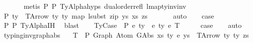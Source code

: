 \begin{isabellebody}
\ \ \ \ \ \isamarkupfalse%
\ {\isacharparenleft}{\kern0pt}metis\ P{}{}\ P{}{}\ TyAlpha{\isachardot}{\kern0pt}hyps{\isacharparenleft}{\kern0pt}{}{\isacharcomma}{\kern0pt}{}{\isacharcomma}{\kern0pt}{}{\isacharparenright}{\kern0pt}\ dual{\isacharunderscore}{\kern0pt}order{\isachardot}{\kern0pt}refl\ lmap{\isacharunderscore}{\kern0pt}ty{\isacharunderscore}{\kern0pt}inv{\isacharunderscore}{\kern0pt}inv{\isacharparenright}{\kern0pt}\isanewline
\ \ \isamarkupfalse%
\ \isamarkupfalse%
\ P{}{}{\isacharcolon}{\kern0pt}\ {\isachardoublequoteopen}ty{\isacharprime}{\kern0pt}\ {\isacharequal}{\kern0pt}\ TArrow\ ty{}\ ty{}\ {\isacharparenleft}{\kern0pt}map\ {\isacharparenleft}{\kern0pt}lsubst\ {\isacharparenleft}{\kern0pt}zip\ ys{\isacharprime}{\kern0pt}\ xs{\isacharprime}{\kern0pt}{\isacharparenright}{\kern0pt}{\isacharparenright}{\kern0pt}\ zs{\isacharparenright}{\kern0pt}{\isachardoublequoteclose}\isanewline
\ \ \ \ \ \isamarkupfalse%
\ auto\isanewline
\isanewline
\ \ \isamarkupfalse%
\ {\isacharquery}{\kern0pt}case\isanewline
\ \ \ \ \isamarkupfalse%
\ P{}{}\ P{}\ TyAlpha{\isachardot}{\kern0pt}IH\ \isamarkupfalse%
\ blast\isanewline
{}\isamarkupfalse%
\isanewline
\ \ \isamarkupfalse%
\ {\isacharparenleft}{\kern0pt}TyCase\ {\isasymGamma}\ P\ e{}\ ty{}\ {\isasymGamma}{}\ e{}\ ty{}\ e{}\ T{\isacharparenright}{\kern0pt}\isanewline
\ \ \isamarkupfalse%
\ \isamarkupfalse%
\ {\isacharquery}{\kern0pt}case\isanewline
\ \ \isamarkupfalse%
\ auto\isanewline
{}\isamarkupfalse%
%
\endisatagproof
{\isafoldproof}%
%
\isadelimproof
\isanewline
%
\endisadelimproof
\isanewline
\isanewline
{}\isamarkupfalse%
\ typing{\isacharunderscore}{\kern0pt}inv{\isacharunderscore}{\kern0pt}graph{\isacharunderscore}{\kern0pt}abs{\isacharcolon}{\kern0pt}\isanewline
\ \ \ T{\isacharcolon}{\kern0pt}\ {\isachardoublequoteopen}{\isasymGamma}\ {\isasymturnstile}{\isacharbraceleft}{\kern0pt}P{\isacharbraceright}{\kern0pt}\ Graph\ {\isacharparenleft}{\kern0pt}Atom\ {\isacharparenleft}{\kern0pt}GAbs\ xs\ ty{}\ e{\isacharparenright}{\kern0pt}\ ys{\isacharparenright}{\kern0pt}\ {\isacharcolon}{\kern0pt}\ TArrow\ ty{}\ ty{}\ zs{\isachardoublequoteclose}\isanewline

\end{isabellebody}
